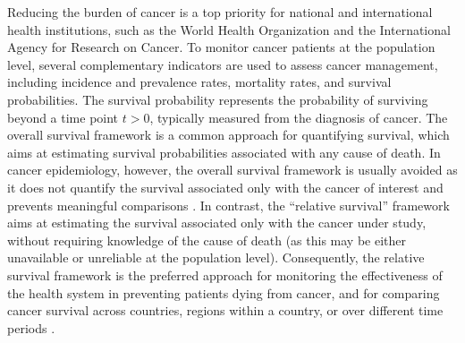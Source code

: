 \documentclass[12pt]{article}
\begin{document}
Reducing the burden of cancer is a top priority for national and international health institutions, such as the World Health Organization and the International Agency for Research on Cancer. To monitor cancer patients at the population level, several complementary indicators are used to assess cancer management, including incidence and prevalence rates, mortality rates, and survival probabilities. The survival probability represents the probability of surviving beyond a time point $t>0$, typically measured from the diagnosis of cancer. The overall survival framework is a common approach for quantifying survival, which aims at estimating survival probabilities associated with any cause of death. In cancer epidemiology, however, the overall survival framework is usually avoided as it does not quantify the survival associated only with the cancer of interest and prevents meaningful comparisons \citep{mariotto:2014,govuk:2024}. In contrast, the ``relative survival'' framework \citep{perme:2012} aims at estimating the survival associated only with the cancer under study, without requiring knowledge of the cause of death (as this may be either unavailable or unreliable at the population level). Consequently, the relative survival framework is the preferred approach for monitoring the effectiveness of the health system in preventing patients dying from cancer, and for comparing cancer survival across countries, regions within a country, or over different time periods \citep{mariotto:2014,govuk:2024,quaresma:2024}. 

\end{document}
